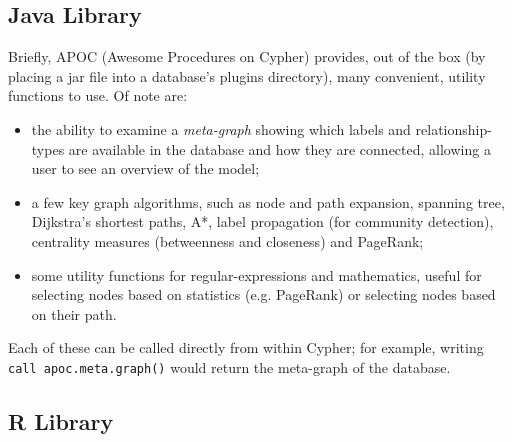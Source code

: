\subsection{Java Library}

Briefly, APOC (Awesome Procedures on Cypher) provides, out of the box (by
placing a jar file into a database's plugins directory), many convenient,
utility functions to use. Of note are:

\begin{itemize}

  \item the ability to examine a \emph{meta-graph} showing which labels and
    relationship-types are available in the database and how they are connected, 
    allowing a user to see an overview of the model;

  \item a few key graph algorithms, such as node and path expansion, spanning
    tree, Dijkstra's shortest paths, A*, label propagation (for community
    detection), centrality measures (betweenness and closeness) and PageRank;

  \item some utility functions for regular-expressions and mathematics, useful
    for selecting nodes based on statistics (e.g. PageRank) or selecting nodes
    based on their path.

\end{itemize}

Each of these can be called directly from within Cypher; for example, writing
\texttt{call apoc.meta.graph()} would return the meta-graph of the database.

%

\subsection{R Library}

